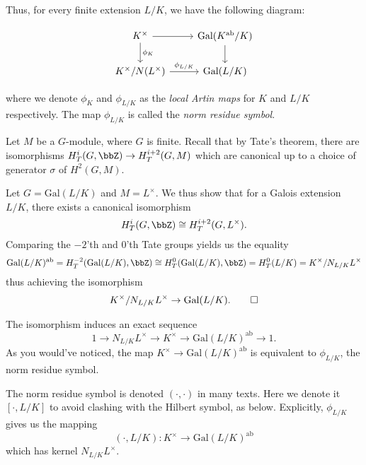 \documentclass[a4paper, 12pt,oneside,openany]{book}
\begin{document}
Thus, for every finite extension $L/K$, we have the following diagram:

\[
\begin{tikzcd}
K^\times  \arrow{r}\arrow{d}{\phi_K} &\text{Gal}(K^{\text{ab}}/K) \arrow{d} \\
K^\times / N(L^\times) \arrow{r}{\phi_{L/K}} &\text{Gal}(L/K)
\end{tikzcd}
\]

where we denote $\phi_K$ and $\phi_{L/K}$ as the \emph{local Artin maps} for $K$ and $L/K$ respectively. The map $\phi_{L/K}$ is called the \emph{norm residue symbol}.



 Let $M$ be a $G$-module, where $G$ is finite. Recall that by Tate's theorem, there are isomorphisms $H_T^i(G, \bbZ) \to H_T^{i+2}(G, M)$ which are canonical up to a choice of generator $\sigma$ of $H^2(G, M)$. 

Let $G = \text{Gal}(L/K)$ and $M=L^\times$. We thus show that for a Galois extension $L/K$, there exists a canonical isomorphism $$H_T^i(G, \bbZ) \cong H_T^{i+2}(G, L^\times).$$ Comparing the $-2$'th and $0$'th Tate groups yields us the equality $$\text{Gal}(L/K)^{\text{ab}} = H_T^{-2}(\text{Gal}(L/K), \bbZ) \cong H_T^0(\text{Gal}(L/K), \bbZ) = H_T^0(L/K) = K^\times / N_{L/K} L^\times$$ thus achieving the isomorphism $$K^\times / N_{L/K} L^\times \to \text{Gal}(L/K). \qed$$

The isomorphism induces an exact sequence $$1 \to N_{L/K}L^\times \to K^\times \to \text{Gal}(L/K)^{\text{ab}} \to 1.$$ As you would've noticed, the map $K^\times \to \text{Gal}(L/K)^\text{ab}$ is equivalent to $\phi_{L/K}$, the norm residue symbol.

The norm residue symbol is denoted $(\cdot, \cdot)$ in many texts. Here we denote it $[\cdot, L/K]$ to avoid clashing with the Hilbert symbol, as below. Explicitly, $\phi_{L/K}$ gives us the mapping $$(\cdot, L/K): K^\times \to \text{Gal}(L/K)^{\text{ab}}$$ which has kernel $N_{L/K} L^\times$. 
\end{document}
